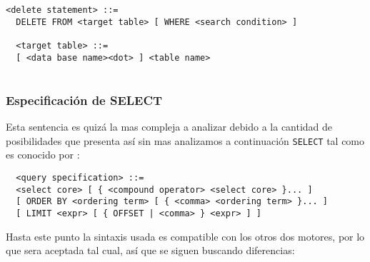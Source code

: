 \begin{Verbatim}[frame=single, label=sintaxis para DELETE]
  <delete statement> ::=
  DELETE FROM <target table> [ WHERE <search condition> ]
  
  <target table> ::=
  [ <data base name><dot> ] <table name>
  
\end{Verbatim}




\subsubsection{Especificación de SELECT} 
\label{especificacion:dialectos:select}
Esta sentencia es quizá la mas compleja a analizar debido a la cantidad de posibilidades que presenta así sin mas analizamos a continuación \verb=SELECT= tal como es conocido por \s:

\begin{Verbatim}
  <query specification> ::=
  <select core> [ { <compound operator> <select core> }... ]
  [ ORDER BY <ordering term> [ { <comma> <ordering term> }... ]
  [ LIMIT <expr> [ { OFFSET | <comma> } <expr> ] ]  
\end{Verbatim}

Hasta este punto la sintaxis usada es compatible con los otros dos motores, por lo que sera aceptada tal cual, así que se siguen buscando diferencias:

